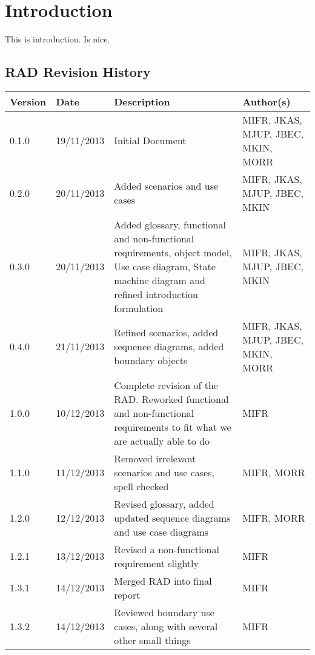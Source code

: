 \chapter{Introduction}

This is introduction. Is nice.

\section{RAD Revision History}
\begin{center}
    \begin{tabular}{ | l | l | p{6cm} | p{4cm} |}
    \hline
    Version & Date & Description & Author(s) \\ \hline
    0.1.0 & 19/11/2013 & Initial Document & MIFR, JKAS, MJUP, JBEC, MKIN, MORR
    \\ \hline
    0.2.0 & 20/11/2013 & Added scenarios and use cases & MIFR, JKAS, MJUP, JBEC, MKIN
    \\ \hline
    0.3.0 & 20/11/2013 & Added glossary, functional and non-functional requirements, object model, Use case diagram, State machine diagram and refined introduction formulation & MIFR, JKAS, MJUP, JBEC, MKIN
    \\ \hline
    0.4.0 & 21/11/2013 & Refined scenarios, added sequence diagrams, added boundary objects & MIFR, JKAS, MJUP, JBEC, MKIN, MORR
    \\ \hline
    1.0.0 & 10/12/2013 & Complete revision of the RAD. Reworked functional and non-functional requirements to fit what we are actually able to do & MIFR
    \\ \hline
    1.1.0 & 11/12/2013 & Removed irrelevant scenarios and use cases, spell checked & MIFR, MORR
    \\ \hline
    1.2.0 & 12/12/2013 & Revised glossary, added updated sequence diagrams and use case diagrams & MIFR, MORR
    \\ \hline
    1.2.1 & 13/12/2013 & Revised a non-functional requirement slightly & MIFR
    \\ \hline
    1.3.1 & 14/12/2013 & Merged RAD into final report & MIFR
    \\ \hline
    1.3.2 & 14/12/2013 & Reviewed boundary use cases, along with several other small things & MIFR
    \\ \hline
    \end{tabular}
\end{center}

